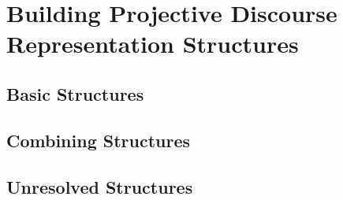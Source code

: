 \section{Building Projective Discourse Representation Structures}

\subsection{Basic Structures}


\subsection{Combining Structures} %


\subsection{Unresolved Structures}
